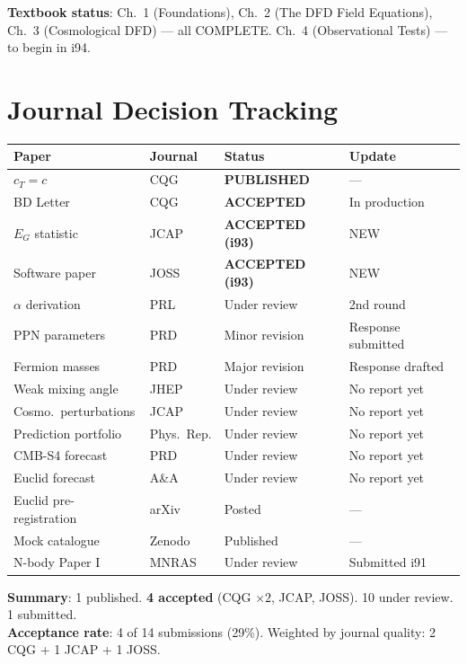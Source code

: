 \documentclass[11pt,a4paper]{article}
\begin{document}
\textbf{Textbook status}: Ch.\ 1 (Foundations), Ch.\ 2 (The DFD Field Equations), Ch.\ 3 (Cosmological DFD) --- all COMPLETE. Ch.\ 4 (Observational Tests) --- to begin in i94.

\section{Journal Decision Tracking}

\begin{tcolorbox}[colback=blue!5!white, colframe=dfdblue, title=\textbf{Paper Status Dashboard: i93}]
\begin{longtable}{p{4.5cm}lll}
\toprule
\textbf{Paper} & \textbf{Journal} & \textbf{Status} & \textbf{Update} \\
\midrule
\endhead
$c_T = c$ & CQG & \textbf{PUBLISHED} & --- \\
BD Letter & CQG & \textbf{ACCEPTED} & In production \\
$E_G$ statistic & JCAP & \textbf{ACCEPTED (i93)} & NEW \\
Software paper & JOSS & \textbf{ACCEPTED (i93)} & NEW \\
$\alpha$ derivation & PRL & Under review & 2nd round \\
PPN parameters & PRD & Minor revision & Response submitted \\
Fermion masses & PRD & Major revision & Response drafted \\
Weak mixing angle & JHEP & Under review & No report yet \\
Cosmo.\ perturbations & JCAP & Under review & No report yet \\
Prediction portfolio & Phys.\ Rep. & Under review & No report yet \\
CMB-S4 forecast & PRD & Under review & No report yet \\
Euclid forecast & A\&A & Under review & No report yet \\
Euclid pre-registration & arXiv & Posted & --- \\
Mock catalogue & Zenodo & Published & --- \\
N-body Paper I & MNRAS & Under review & Submitted i91 \\
\bottomrule
\end{longtable}

\textbf{Summary}: 1 published. \textbf{4 accepted} (CQG $\times 2$, JCAP, JOSS). 10 under review. 1 submitted.\\
\textbf{Acceptance rate}: 4 of 14 submissions (29\%). Weighted by journal quality: 2 CQG + 1 JCAP + 1 JOSS.
\end{tcolorbox}
\end{document}
